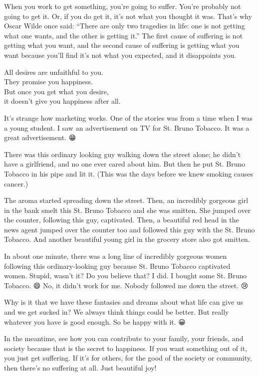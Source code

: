 \documentclass[12pt, openany]{book}
\newenvironment{aphorism}%
{%
\begin{center}\begin{itshape}
}%
{\end{itshape}\end{center}
}%
\begin{document}
When you work to get something, you’re going to suffer. You’re probably not going to get it. Or, if you do get it, it’s not what you thought it was. That’s why Oscar Wilde once said: “There are only two tragedies in life: one is not getting what one wants, and the other is getting it.” The first cause of suffering is not getting what you want, and the second cause of suffering is getting what you want because you’ll find it’s not what you expected, and it disappoints you. 

\begin{aphorism}
All desires are unfaithful to you.\\  
They promise you happiness.\\ 
But once you get what you desire,\\  
it doesn’t give you happiness after all.
\end{aphorism}

It’s strange how marketing works. One of the stories was from a time when I was a young student. I saw an advertisement on TV for St. Bruno Tobacco. It was a great advertisement. 😁

There was this ordinary looking guy walking down the street alone; he didn’t have a girlfriend, and no one ever cared about him. But then he put St. Bruno Tobacco in his pipe and lit it. (This was the days before we knew smoking causes cancer.) 

The aroma started spreading down the street. Then, an incredibly gorgeous girl in the bank smelt this St. Bruno Tobacco and she was smitten. She jumped over the counter, following this guy, captivated. Then, a beautiful red head in the news agent jumped over the counter too and followed this guy with the St. Bruno Tobacco. And another beautiful young girl in the grocery store also got smitten. 

In about one minute, there was a long line of incredibly gorgeous women following this ordinary-looking guy because St. Bruno Tobacco captivated women. Stupid, wasn’t it? Do you believe that? I did. I bought some St. Bruno Tobacco. 😄 No, it didn’t work for me. Nobody followed me down the street. 😢 

Why is it that we have these fantasies and dreams about what life can give us and we get sucked in? We always think things could be better. But really whatever you have is good enough. So be happy with it. 😀

In the meantime, see how you can contribute to your family, your friends, and society because that is the secret to happiness. If you want something out of it, you just get suffering. If it’s for others, for the good of the society or community, then there’s no suffering at all. Just beautiful joy! 
\end{document}
